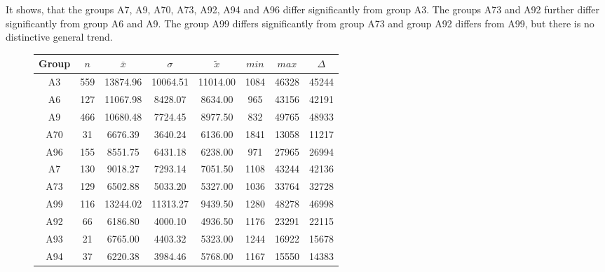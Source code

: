 It shows, that the groups A7, A9, A70, A73, A92, A94 and A96 differ significantly from group A3. The groups A73 and A92 further differ significantly from group A6 and A9. The group A99 differs significantly from group A73 and group A92 differs from A99, but there is no distinctive general trend.
\begin{figure}[ht!]
	\centering
	\begin{minipage}{0.5\textwidth}
		\tiny
		\setlength{\tabcolsep}{4pt}
		\centering
		\begin{tabular}{c|c|c|c|c|c|c|c}
			\toprule
			Group & $n$ & $\bar{x}$ & $\sigma$ & $\tilde{x}$ & $min$ & $max$ & $\Delta$ \\
			\midrule
			A3  & 559 & 13874.96 & 10064.51 & 11014.00 & 1084 & 46328 & 45244 \\ 
			A6  & 127 & 11067.98 & 8428.07  & 8634.00  & 965  & 43156 & 42191 \\ 
			A9  & 466 & 10680.48 & 7724.45  & 8977.50  & 832  & 49765 & 48933 \\ 
			A70 & 31  & 6676.39  & 3640.24  & 6136.00  & 1841 & 13058 & 11217 \\ 
			A96 & 155 & 8551.75  & 6431.18  & 6238.00  & 971  & 27965 & 26994 \\ 
			A7  & 130 & 9018.27  & 7293.14  & 7051.50  & 1108 & 43244 & 42136 \\ 
			A73 & 129 & 6502.88  & 5033.20  & 5327.00  & 1036 & 33764 & 32728 \\ 
			A99 & 116 & 13244.02 & 11313.27 & 9439.50  & 1280 & 48278 & 46998 \\ 
			A92 & 66  & 6186.80  & 4000.10  & 4936.50  & 1176 & 23291 & 22115 \\ 
			A93 & 21  & 6765.00  & 4403.32  & 5323.00  & 1244 & 16922 & 15678 \\ 
			A94 & 37  & 6220.38  & 3984.46  & 5768.00  & 1167 & 15550 & 14383 \\ 
			\bottomrule
		\end{tabular}
		\label{tbl:descriptives_baysis_matched_Str_SMax}
	\end{minipage}%
	\begin{minipage}{0.55\textwidth}
\end{minipage}
\end{figure}
